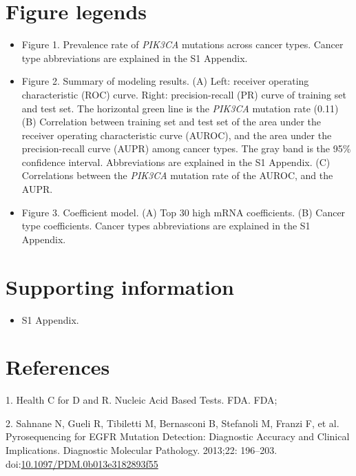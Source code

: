 \documentclass[10pt,letterpaper]{article}
\providecommand{\tightlist}{%
  \setlength{\itemsep}{0pt}\setlength{\parskip}{0pt}}
\begin{document}
\hypertarget{figure-legends}{%
\section{Figure legends}\label{figure-legends}}

\begin{itemize}
\item
  Figure 1. Prevalence rate of \emph{PIK3CA} mutations across cancer
  types. Cancer type abbreviations are explained in the S1 Appendix.
\item
  Figure 2. Summary of modeling results. (A) Left: receiver operating
  characteristic (ROC) curve. Right: precision-recall (PR) curve of
  training set and test set. The horizontal green line is the
  \emph{PIK3CA} mutation rate (0.11) (B) Correlation between training
  set and test set of the area under the receiver operating
  characteristic curve (AUROC), and the area under the precision-recall
  curve (AUPR) among cancer types. The gray band is the 95\% confidence
  interval. Abbreviations are explained in the S1 Appendix. (C)
  Correlations between the \emph{PIK3CA} mutation rate of the AUROC, and
  the AUPR.
\item
  Figure 3. Coefficient model. (A) Top 30 high mRNA coefficients. (B)
  Cancer type coefficients. Cancer types abbreviations are explained in
  the S1 Appendix.
\end{itemize}

\hypertarget{supporting-information}{%
\section{Supporting information}\label{supporting-information}}

\begin{itemize}
\tightlist
\item
  S1 Appendix.
\end{itemize}

\hypertarget{references}{%
\section*{References}\label{references}}

\hypertarget{refs}{}
\leavevmode\hypertarget{ref-healthNucleicAcidBased2020}{}%
1. Health C for D and R. Nucleic Acid Based Tests. FDA. FDA;

\leavevmode\hypertarget{ref-sahnanePyrosequencingEGFRMutation2013}{}%
2. Sahnane N, Gueli R, Tibiletti M, Bernasconi B, Stefanoli M, Franzi F,
et al. Pyrosequencing for EGFR Mutation Detection: Diagnostic Accuracy
and Clinical Implications. Diagnostic Molecular Pathology. 2013;22:
196--203.
doi:\href{https://doi.org/10.1097/PDM.0b013e3182893f55}{10.1097/PDM.0b013e3182893f55}
\end{document}

